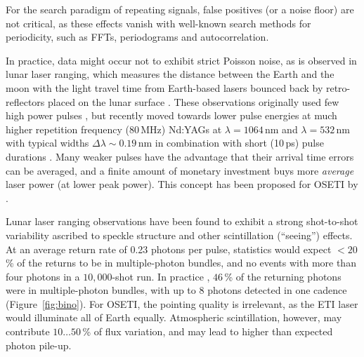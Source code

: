 \documentclass[twocolumn,tighten,longauthor]{myaastex62}
\begin{document}
For the search paradigm of repeating signals, false positives (or a noise floor) are not critical, as these effects vanish with well-known search methods for periodicity, such as FFTs, periodograms and autocorrelation.

In practice, data might occur not to exhibit strict Poisson noise, as is observed in lunar laser ranging, which measures the distance between the Earth and the moon with the light travel time from Earth-based lasers bounced back by retro-reflectors placed on the lunar surface \citep{2008PASP..120...20M,2012CQGra..29r4005M}. These observations originally used few high power pulses \citep{1985ITGRS..23..385S,1998A&AS..130..235S,2013RPPh...76g6901M}, but recently moved towards lower pulse energies at much higher repetition frequency (80\,MHz) Nd:YAGs at $\lambda=1064\,$nm and $\lambda=532\,$nm with typical widths $\Delta \lambda\sim0.19\,$nm in combination with short (10\,ps) pulse durations \citep{2017CQGra..34x5008A}. Many weaker pulses have the advantage that their arrival time errors can be averaged, and a finite amount of monetary investment buys more \textit{average} laser power (at lower peak power). This concept has been proposed for OSETI by \citet{2013AsBio..13..521L}.

Lunar laser ranging observations have been found to exhibit a strong shot-to-shot variability ascribed to speckle structure and other scintillation (``seeing'') effects. At an average return rate of 0.23 photons per pulse, statistics would expect $<20$\,\% of the returns to be in multiple-photon bundles, and no events with more than four photons in a $10{,}000$-shot run. In practice \citep{2008PASP..120...20M}, $46\,$\% of the returning photons were in multiple-photon bundles, with up to 8 photons detected in one cadence (Figure~\ref{fig:bino}). For OSETI, the pointing quality is irrelevant, as the ETI laser would illuminate all of Earth equally. Atmospheric scintillation, however, may contribute $10\dots50\,$\% of flux variation, and may lead to higher than expected photon pile-up.
\end{document}
